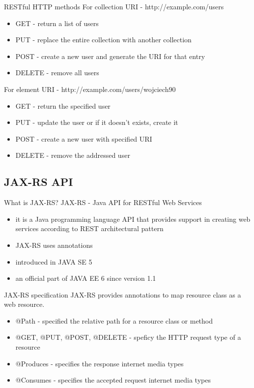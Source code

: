 	\begin{frame}{RESTful HTTP methods}	
		For collection URI - http://example.com/users
		\begin{itemize}
		  \item GET - return a list of users
		  \item PUT - replace the entire collection with another collection
		  \item POST - create a new user and generate the URI for that entry
		  \item DELETE - remove all users
		\end{itemize}
		
		\vspace{1cm}
		
		For element URI - http://example.com/users/wojciech90
		\begin{itemize}
		  \item GET - return the specified user
		  \item PUT - update the user or if it doesn't exists, create it
		  \item POST - create a new user with specified URI
		  \item DELETE - remove the addressed user
		\end{itemize}
	\end{frame}	
  
\subsection{JAX-RS API}
	\begin{frame}{What is JAX-RS?}
		JAX-RS - Java API for RESTful Web Services
	
    	\begin{itemize}
			\item it is a Java programming language API that provides support in creating web services according to REST architectural pattern
			\item JAX-RS uses annotations
			\item introduced in JAVA SE 5
			\item an official part of JAVA EE 6 since version 1.1
		\end{itemize}
	\end{frame}
	
	\begin{frame}{JAX-RS specification}
		JAX-RS provides annotations to map resource class as a web resource.
		\begin{itemize}
		  \item @Path - specified the relative path for a resource class or method
		  \item @GET, @PUT, @POST, @DELETE - speficy the HTTP request type of a resource
		  \item @Produces - specifies the response internet media types
		  \item @Consumes - specifies the accepted request internet media types
		\end{itemize}	
	\end{frame}
	
